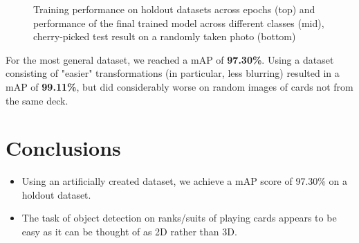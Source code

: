 \documentclass[a0,landscape]{a0poster}
\begin{document}
\begin{multicols}{3}
\begin{figure}
  \caption{Training performance on holdout datasets across epochs (top) and performance of the final trained model across different classes (mid), cherry-picked test result on a randomly taken photo (bottom)}
\end{figure}
For the most general dataset, we reached a mAP of \textbf{97.30\%}. Using a dataset consisting of "easier" transformations (in particular, less blurring) resulted in a mAP of \textbf{99.11\%}, but did considerably worse on random images of cards not from the same deck.






\section*{Conclusions}

\begin{itemize}
\item Using an artificially created dataset, we achieve a mAP score of 97.30\% on a holdout dataset.
\item The task of object detection on ranks/suits of playing cards appears to be easy as it can be thought of as 2D rather than 3D.

\end{itemize}



\color{DarkSlateGray} %


\nocite{*} %
\footnotesize



\end{multicols}
\end{document}

